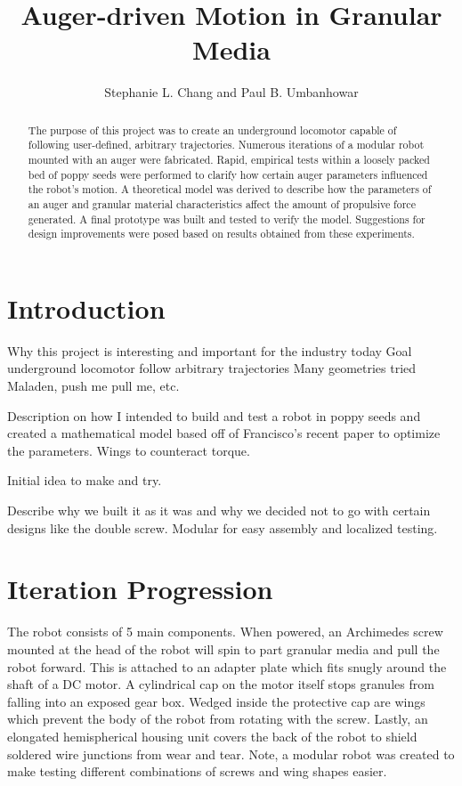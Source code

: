 \documentclass[letterpaper, 11 pt]{article}
\title{\Large \bf Auger-driven Motion in Granular Media}
\author{\centering Stephanie L. Chang and Paul B. Umbanhowar}
\begin{document}
\maketitle

\begin{abstract}
The purpose of this project was to create an underground locomotor capable of following user-defined, arbitrary trajectories. Numerous iterations of a modular robot mounted with an auger were fabricated. Rapid, empirical tests within a loosely packed bed of poppy seeds were performed to clarify how certain auger parameters influenced the robot's motion. A theoretical model was derived to describe how the parameters of an auger and granular material characteristics affect the amount of propulsive force generated. A final prototype was built and tested to verify the model. Suggestions for design improvements were posed based on results obtained from these experiments.    

\end{abstract}

\tableofcontents

\section{Introduction}

Why this project is interesting and important for the industry today
Goal underground locomotor follow arbitrary trajectories
Many geometries tried Maladen, push me pull me, etc. 

Description on how I intended to build and test a robot in poppy seeds and created a mathematical model based off of Francisco's recent paper to optimize the parameters.  
Wings to counteract torque.

Initial idea to make and try.

Describe why we built it as it was and why we decided not to go with certain designs like the double screw. Modular for easy assembly and localized testing. 

\section{Iteration Progression}

The robot consists of 5 main components. When powered, an Archimedes screw mounted at the head of the robot will spin to part granular media and pull the robot forward. This is attached to an adapter plate which fits snugly around the shaft of a DC motor. A cylindrical cap on the motor itself stops granules from falling into an exposed gear box. Wedged inside the protective cap are wings which prevent the body of the robot from rotating with the screw. Lastly, an elongated hemispherical housing unit covers the back of the robot to shield soldered wire junctions from wear and tear. Note, a modular robot was created to make testing different combinations of screws and wing shapes easier.
\end{document}
